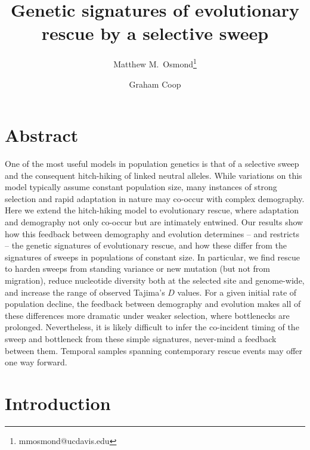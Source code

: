 \documentclass[]{article}
\title{Genetic signatures of evolutionary rescue by a selective sweep}
\author[*]{Matthew M.\ Osmond\thanks{mmosmond@ucdavis.edu}}
\author[*]{Graham Coop}
\affil[*]{Center for Population Biology and Department of Evolution and Ecology, University of California, Davis, California 95616}
\date{}
\begin{document}

\maketitle

\section*{Abstract}
\label{sec:abstract}

One of the most useful models in population genetics is that of a selective sweep and the consequent hitch-hiking of linked neutral alleles.
While variations on this model typically assume constant population size, many instances of strong selection and rapid adaptation in nature may co-occur with complex demography.
Here we extend the hitch-hiking model to evolutionary rescue, where adaptation and demography not only co-occur but are intimately entwined. 
Our results show how this feedback between demography and evolution determines -- and restricts -- the genetic signatures of evolutionary rescue, and how these differ from the signatures of sweeps in populations of constant size.
In particular, we find rescue to harden sweeps from standing variance or new mutation (but not from migration), reduce nucleotide diversity both at the selected site and genome-wide, and increase the range of observed Tajima's $D$ values.
For a given initial rate of population decline, the feedback between demography and evolution makes all of these differences more dramatic under weaker selection, where bottlenecks are prolonged. 
Nevertheless, it is likely difficult to infer the co-incident timing of the sweep and bottleneck from these simple signatures, never-mind a feedback between them. 
Temporal samples spanning contemporary rescue events may offer one way forward.

\section*{Introduction}
\label{sec:intro}
\end{document}
